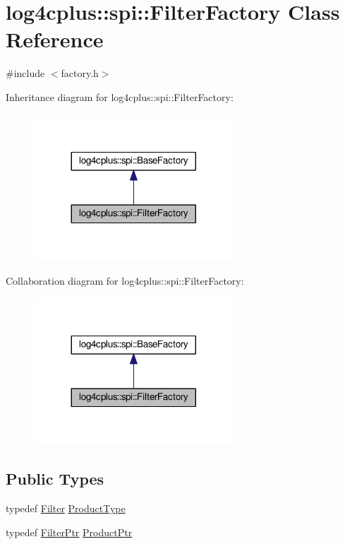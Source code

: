 \hypertarget{classlog4cplus_1_1spi_1_1FilterFactory}{\section{log4cplus\-:\-:spi\-:\-:Filter\-Factory Class Reference}
\label{classlog4cplus_1_1spi_1_1FilterFactory}
}


{\ttfamily \#include $<$factory.\-h$>$}



Inheritance diagram for log4cplus\-:\-:spi\-:\-:Filter\-Factory\-:
\nopagebreak
\begin{figure}[H]
\begin{center}
\leavevmode
\includegraphics[width=212pt]{classlog4cplus_1_1spi_1_1FilterFactory__inherit__graph}
\end{center}
\end{figure}


Collaboration diagram for log4cplus\-:\-:spi\-:\-:Filter\-Factory\-:
\nopagebreak
\begin{figure}[H]
\begin{center}
\leavevmode
\includegraphics[width=212pt]{classlog4cplus_1_1spi_1_1FilterFactory__coll__graph}
\end{center}
\end{figure}
\subsection*{Public Types}
\begin{DoxyCompactItemize}
\item 
typedef \hyperlink{classlog4cplus_1_1spi_1_1Filter}{Filter} \hyperlink{classlog4cplus_1_1spi_1_1FilterFactory_a32b9b9673dd35de64ed4e248b680ffc5}{Product\-Type}
\item 
typedef \hyperlink{namespacelog4cplus_1_1spi_abfdea757523ce8fe4598502a29bc7545}{Filter\-Ptr} \hyperlink{classlog4cplus_1_1spi_1_1FilterFactory_abab76c9c84cfb09660bdf8dca848f568}{Product\-Ptr}
\end{DoxyCompactItemize}

